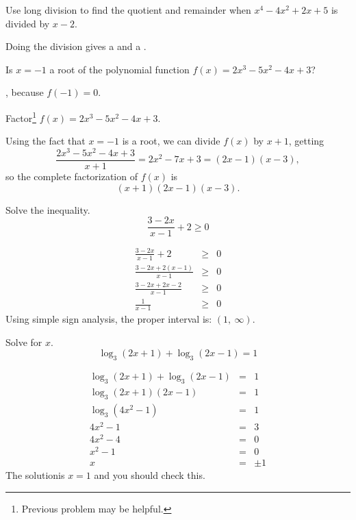 \documentclass[12pt,addpoints, answers, fleqn]{exam}
\begin{document}
\begin{questions}
\question Use long division to find the quotient and remainder when $x^4 - 4x^2 + 2x +5$ is divided by $x-2$.
\begin{solution}
Doing the division gives a  and a .
\end{solution}
\question Is $x=-1$ a root of the polynomial function $f\left( x \right) = 2x^3-5x^2-4x+3$?
\begin{solution}
, because $f\left( -1 \right) = 0$.
\end{solution}
\question Factor\footnote{Previous problem may be helpful.} $f\left( x \right) = 2x^3-5x^2-4x+3$.
\begin{solution}
Using the fact that $x=-1$ is a root, we can divide $f\left( x \right)$ by $x+1$, getting
\[
\frac{2x^3-5x^2-4x+3}{x+1} = 2x^2-7x+3 = \left(2x - 1 \right) \left(x - 3 \right),
\]
so the complete factorization of $f\left( x \right)$ is
\[
\boxed{\left(x + 1 \right)\left(2x - 1 \right) \left(x - 3 \right)}.
\]
\end{solution}
\question Solve the inequality.
\[
\frac{3-2x}{x-1} + 2 \geq 0
\]
\begin{solution}
\begin{eqnarray*}
\frac{3-2x}{x-1} + 2 &\geq& 0\\
\frac{3-2x + 2 \left( x-1\right) }{x-1} &\geq& 0\\
\frac{3-2x + 2x-2 }{x-1} &\geq& 0\\
\frac{1 }{x-1} &\geq& 0
\end{eqnarray*}
Using simple sign analysis, the proper interval is: $\boxed{\left( 1, \ \infty \right)}$.
\end{solution}
\question Solve for $x$.
\[
\log_3 \left( 2x + 1 \right)  + \log_3 \left( 2x - 1 \right)  = 1
\]
\begin{solution}
\begin{eqnarray*}
\log_3 \left( 2x + 1 \right)  + \log_3 \left( 2x - 1 \right)  &=& 1\\
\log_3 \left( 2x + 1 \right)\left( 2x - 1 \right)  &=& 1\\
\log_3 \left( 4x^2 - 1 \right)  &=& 1\\
4x^2 - 1  &=& 3\\
4x^2 - 4  &=& 0\\
x^2 - 1  &=& 0\\
x &=& \pm 1
\end{eqnarray*}
The solutionis $\boxed{x=1}$ and you should check this.


\end{solution}
\end{questions}
\end{document}
